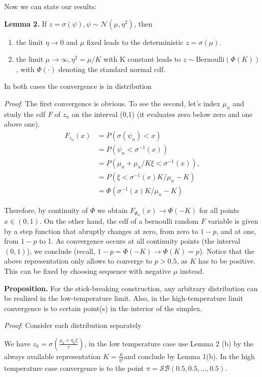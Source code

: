 \documentclass[twoside]{article}
\begin{document}
Now we can state our results:

\textbf{Lemma 2.} If $z=\sigma(\psi),\psi\sim\mathcal{N}(\mu,\eta^2)$, then
\begin{enumerate} \item the  limit $\eta\rightarrow 0$ and $\mu$ fixed leads to the deterministic $z=\sigma(\mu)$. 
\item the limit $\mu\rightarrow \infty, \eta^2=\mu/K$ with K constant leads to $z\sim \text{Bernoulli}(\Phi(K))$, with $\Phi(\cdot)$ denoting the standard normal cdf.
\end{enumerate} In both cases the convergence is in distribution 

\textit{Proof}. The first convergence is obvious. To see the second, let's index $\mu_n$ and  study the cdf $F$ of $z_n$ on the interval (0,1) (it evaluates zero below zero and one above one).
\begin{align}F_{z_n}(x)&= P(\sigma(\psi_n)<x) \\
&=P(\psi_n< \sigma^{-1}(x))\\
&=P(\mu_n +\mu_n/K\xi <\sigma^{-1}(x)),\\\
&= P( \xi <\sigma^{-1}(x)K/\mu_n - K)\\
&= \Phi( \sigma^{-1}(x)K/\mu_n - K) 
\end{align}

Therefore, by continuity of $\Phi$ we obtain $F_{\Psi_n}(x)\rightarrow \Phi(-K)$ for all points $x\in(0,1)$. On the other hand, the cdf of a bernoulli random $F$ variable is given by  a step function that abruptly changes at zero, from zero to $1-p$, and at one, from $1-p$ to 1. As convergence occurs at all continuity points (the interval $(0,1)$), we conclude (recall, $1-p= \Phi(-K)\rightarrow \Phi(K)=p$). Notice that the above representation only allows  to converge to $p>0.5$, as $K$ has to be positive. This can be fixed by choosing sequence with negative $\mu$ instead.

\textbf{Proposition.} For the stick-breaking construction, any arbitrary distribution can be realized in the low-temperature limit. Also, in the high-temperature limit convergence is to certain point(s) in the interior of the simplex.

\textit{Proof}: Consider each distribution separately

We have $z_k = \sigma\left( \frac{\mu_k+\eta_k\xi}{\tau}\right)$, in the low temperature case use Lemma 2 (b) by the always available representation  $K= \frac{\mu}{\eta^2}$and conclude by Lemma 1(b). In the high temperature case convergence is to the point $\pi = \mathcal{SB}(0.5,0.5,\ldots, 0.5)$.
\end{document}

